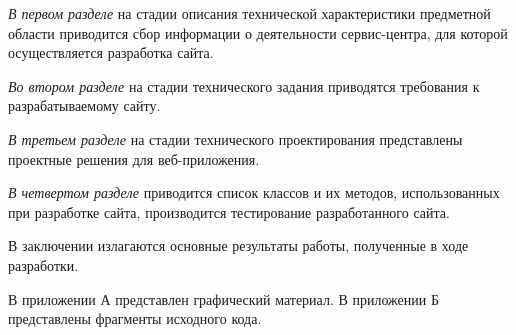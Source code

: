\emph{В первом разделе} на стадии описания технической характеристики предметной области приводится сбор информации о деятельности сервис-центра, для которой осуществляется разработка сайта.

\emph{Во втором разделе} на стадии технического задания приводятся требования к разрабатываемому сайту.

\emph{В третьем разделе} на стадии технического проектирования представлены проектные решения для веб-приложения.

\emph{В четвертом разделе} приводится список классов и их методов, использованных при разработке сайта, производится тестирование разработанного сайта.

В заключении излагаются основные результаты работы, полученные в ходе разработки.

В приложении А представлен графический материал.
В приложении Б представлены фрагменты исходного кода. 
